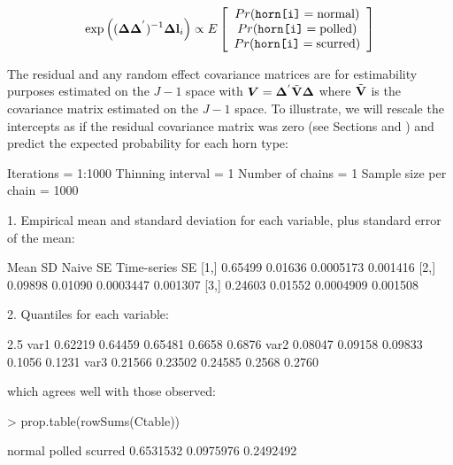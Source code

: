 \documentclass{article}
\begin{document}
\begin{equation}
\textrm{exp}\left(({\bm \Delta}{\bm \Delta}^{'})^{-1}{\bm \Delta}{\bf l}_{i}\right) \propto E\left[\begin{array}{c} Pr(\texttt{horn[i]}=\textrm{normal})\\ Pr(\texttt{horn[i]}=\textrm{polled})\\ Pr(\texttt{horn[i]}=\textrm{scurred}) \end{array} \right]
\end{equation}

The residual and any random effect covariance matrices are for estimability purposes estimated on the $J-1$ space with  ${\bm V}={\bm \Delta}^{'}\tilde{\bf V}{\bm \Delta}$ where $\tilde{\bf V}$ is the covariance matrix estimated on the $J-1$ space. To illustrate, we will rescale the intercepts as if the residual covariance matrix was zero (see Sections and \label{pred-sec} \label{cat-sec}) and predict the expected probability for each horn type:

\begin{Schunk}
\begin{Soutput}
Iterations = 1:1000
Thinning interval = 1 
Number of chains = 1 
Sample size per chain = 1000 

1. Empirical mean and standard deviation for each variable,
   plus standard error of the mean:

        Mean      SD  Naive SE Time-series SE
[1,] 0.65499 0.01636 0.0005173       0.001416
[2,] 0.09898 0.01090 0.0003447       0.001307
[3,] 0.24603 0.01552 0.0004909       0.001508

2. Quantiles for each variable:

        2.5%
var1 0.62219 0.64459 0.65481 0.6658 0.6876
var2 0.08047 0.09158 0.09833 0.1056 0.1231
var3 0.21566 0.23502 0.24585 0.2568 0.2760
\end{Soutput}
\end{Schunk}

which agrees well with those observed:

\begin{Schunk}
\begin{Sinput}
> prop.table(rowSums(Ctable))
\end{Sinput}
\begin{Soutput}
   normal    polled   scurred 
0.6531532 0.0975976 0.2492492 
\end{Soutput}
\end{Schunk}
\end{document}
